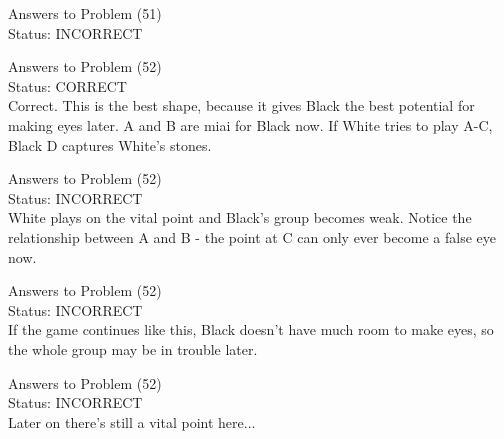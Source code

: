 \documentclass[11pt]{article}
\begin{document}
\begin{minipage}[t]{0.5\textwidth}
  {\centering
  
  Answers to Problem (51)\\
  Status: INCORRECT\\
  
  }
\end{minipage}
\begin{minipage}[t]{0.5\textwidth}
  {\centering
  
  Answers to Problem (52)\\
  Status: CORRECT\\
  Correct. This is the best shape, because it gives Black the best potential for making eyes later. A and B are miai for Black now. If White tries to play A-C, Black D captures White's stones.\\
  }
\end{minipage}
\begin{minipage}[t]{0.5\textwidth}
  {\centering
  
  Answers to Problem (52)\\
  Status: INCORRECT\\
  White plays on the vital point and Black's group becomes weak. Notice the relationship between A and B - the point at C can only ever become a false eye now.\\
  }
\end{minipage}
\begin{minipage}[t]{0.5\textwidth}
  {\centering
  
  Answers to Problem (52)\\
  Status: INCORRECT\\
  If the game continues like this, Black doesn't have much room to make eyes, so the whole group may be in trouble later.\\
  }
\end{minipage}
\begin{minipage}[t]{0.5\textwidth}
  {\centering
  
  Answers to Problem (52)\\
  Status: INCORRECT\\
  Later on there's still a vital point here...\\
  }
\end{minipage}
\end{document}
